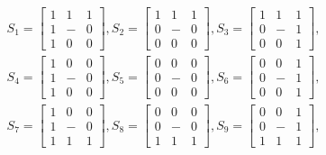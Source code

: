 \documentclass[paper=a4, fontsize=11pt]{scrartcl} %
\numberwithin{equation}{section} %
\numberwithin{figure}{section} %
\numberwithin{table}{section} %
\begin{document}
\begin{align*}
S_1 = 
\begin{bmatrix}
    1 & 1 & 1\\
    1 & - & 0\\
    1 & 0 & 0
\end{bmatrix},
S_2 = 
\begin{bmatrix}
    1 & 1 & 1\\
    0 & - & 0\\
    0 & 0 & 0
\end{bmatrix},
S_3 = 
\begin{bmatrix}
    1 & 1 & 1\\
    0 & - & 1\\
    0 & 0 & 1
\end{bmatrix},\\
S_4 = 
\begin{bmatrix}
    1 & 0 & 0\\
    1 & - & 0\\
    1 & 0 & 0
\end{bmatrix},
S_5 = 
\begin{bmatrix}
    0 & 0 & 0\\
    0 & - & 0\\
    0 & 0 & 0
\end{bmatrix},
S_6 = 
\begin{bmatrix}
    0 & 0 & 1\\
    0 & - & 1\\
    0 & 0 & 1
\end{bmatrix},\\
S_7 = 
\begin{bmatrix}
    1 & 0 & 0\\
    1 & - & 0\\
    1 & 1 & 1
\end{bmatrix},
S_8 = 
\begin{bmatrix}
    0 & 0 & 0\\
    0 & - & 0\\
    1 & 1 & 1
\end{bmatrix},
S_9 = 
\begin{bmatrix}
    0 & 0 & 1\\
    0 & - & 1\\
    1 & 1 & 1
\end{bmatrix},
\end{align*}
\end{document}

